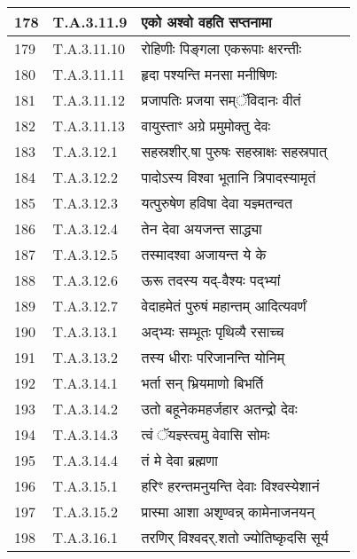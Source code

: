 \documentclass[17pt]{extarticle}
\begin{document}
\begin{longtable}{||p{0.4in}||p{0.9in}||p{4.0in}||p{0.9in}||}
        \hline
            178 & T.A.3.11.9 & एको अश्वो वहति सप्तनामा &      \\
        \hline
            179 & T.A.3.11.10 & रोहिणीः पिङ्गला एकरूपाः क्षरन्तीः &      \\
        \hline
            180 & T.A.3.11.11 & हृदा पश्यन्ति मनसा मनीषिणः &      \\
        \hline
            181 & T.A.3.11.12 & प्रजापतिः प्रजया सम्ॅविदानः वीतं &      \\
        \hline
            182 & T.A.3.11.13 & वायुस्ताꣳ अग्रे प्रमुमोक्तु देवः &      \\
        \hline
            183 & T.A.3.12.1 & सहस्रशीर्.षा पुरुषः सहस्राक्षः सहस्रपात् &      \\
        \hline
            184 & T.A.3.12.2 & पादोऽस्य विश्वा भूतानि त्रिपादस्यामृतं &      \\
        \hline
            185 & T.A.3.12.3 & यत्पुरुषेण हविषा देवा यज्ञ्मतन्वत &      \\
        \hline
            186 & T.A.3.12.4 & तेन देवा अयजन्त साद्ध्या &      \\
        \hline
            187 & T.A.3.12.5 & तस्मादश्वा अजायन्त ये के &      \\
        \hline
            188 & T.A.3.12.6 & ऊरू तदस्य यद्{-}वैश्यः पद्भ्यां &      \\
        \hline
            189 & T.A.3.12.7 & वेदाहमेतं पुरुषं महान्तम् आदित्यवर्णं &      \\
        \hline
            190 & T.A.3.13.1 & अद्भ्यः सम्भूतः पृथिव्यै रसाच्च &      \\
        \hline
            191 & T.A.3.13.2 & तस्य धीराः परिजानन्ति योनिम् &      \\
        \hline
            192 & T.A.3.14.1 & भर्ता सन् भ्रियमाणो बिभर्ति &      \\
        \hline
            193 & T.A.3.14.2 & उतो बहूनेकमहर्जहार अतन्द्रो देवः &      \\
        \hline
            194 & T.A.3.14.3 & त्वं ॅयज्ञ्स्त्वमु वेवासि सोमः &      \\
        \hline
            195 & T.A.3.14.4 & तं मे देवा ब्रह्मणा &      \\
        \hline
            196 & T.A.3.15.1 & हरिꣳ हरन्तमनुयन्ति देवाः विश्वस्येशानं &      \\
        \hline
            197 & T.A.3.15.2 & प्रास्मा आशा अशृण्वन्न् कामेनाजनयन् &      \\
        \hline
            198 & T.A.3.16.1 & तरणिर् विश्वदर्.शतो ज्योतिष्कृदसि सूर्य &      \\

\end{longtable}
\end{document}
